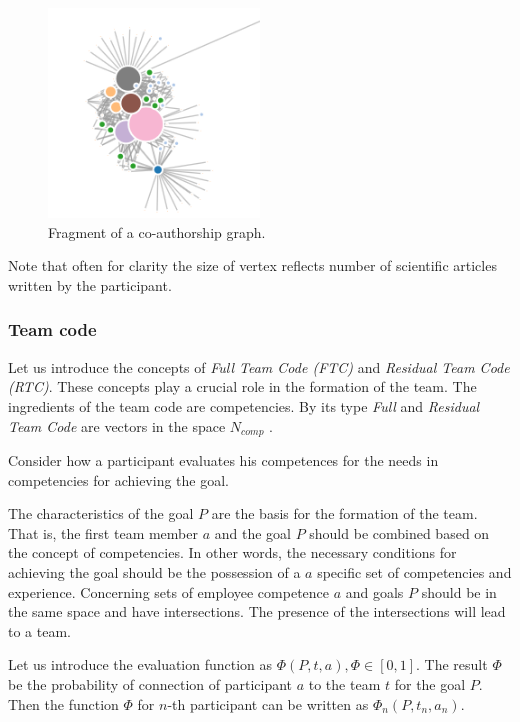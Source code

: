 \documentclass[12pt]{report}
\theoremstyle{definition}
\begin{document}
\begin{figure}[ht]
	\centering
	\includegraphics[width=0.5\textwidth]{scrum-img8}
	\caption{Fragment of a co-authorship graph.}	
	\label{fig:ta8}
\end{figure}  

Note that often for clarity the size of vertex reflects number of scientific articles written by the participant.

\subsubsection{Team code}

Let us introduce the concepts of \emph{Full Team Code (FTC)} and \emph{Residual Team Code (RTC)}.
These concepts play a crucial role in the formation of the team. 
The ingredients of the team code are competencies. 
By its type \emph{Full} and \emph{Residual} \emph{Team Code} are vectors in the space $N_{comp}$ .

Consider how a participant evaluates his competences for the needs in competencies for achieving the goal.

The characteristics of the goal $P$  are the basis for the formation of the team. 
That is, the first team member $a$ and the goal $P$ should be combined based on the concept of competencies. 
In other words, the necessary conditions for achieving the goal should be the possession of a $a$ specific set of competencies and experience. 
Concerning sets of employee competence $a$ and goals $P$ should be in the same space and have intersections. 
The presence of the intersections will lead to a team.

Let us introduce the evaluation function as $\Phi (P,t,a), \Phi \in [0,1] $. 
The result $\Phi$ be the probability of connection of participant $a$ to the team $t$ for the goal $P$. 
Then the function $\Phi$ for $n$-th participant can be written as $\Phi_n (P,t_{n},a_n)$.
\end{document}
